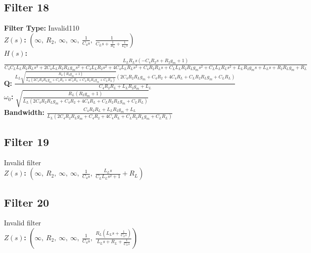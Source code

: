 \documentclass{article}
\begin{document}
\subsection*{Filter 18}
\textbf{Filter Type:} Invalid110 \\ 
\textbf{$Z(s)$:} $\left( \infty, \  R_{2}, \  \infty, \  \infty, \  \frac{1}{C_{4} s}, \  \frac{1}{C_{L} s + \frac{1}{R_{L}} + \frac{1}{L_{L} s}}\right)$ \\ 
\textbf{$H(s)$:} $\frac{L_{L} R_{L} s \left(- C_{4} R_{2} s + R_{2} g_{m} + 1\right)}{C_{4} C_{L} L_{L} R_{2} R_{L} s^{3} + 2 C_{4} L_{L} R_{2} R_{L} g_{m} s^{2} + C_{4} L_{L} R_{2} s^{2} + 4 C_{4} L_{L} R_{L} s^{2} + C_{4} R_{2} R_{L} s + C_{L} L_{L} R_{2} R_{L} g_{m} s^{2} + C_{L} L_{L} R_{L} s^{2} + L_{L} R_{2} g_{m} s + L_{L} s + R_{2} R_{L} g_{m} + R_{L}}$ \\ 
\textbf{Q:} $\frac{L_{L} \sqrt{\frac{R_{L} \left(R_{2} g_{m} + 1\right)}{L_{L} \left(2 C_{4} R_{2} R_{L} g_{m} + C_{4} R_{2} + 4 C_{4} R_{L} + C_{L} R_{2} R_{L} g_{m} + C_{L} R_{L}\right)}} \left(2 C_{4} R_{2} R_{L} g_{m} + C_{4} R_{2} + 4 C_{4} R_{L} + C_{L} R_{2} R_{L} g_{m} + C_{L} R_{L}\right)}{C_{4} R_{2} R_{L} + L_{L} R_{2} g_{m} + L_{L}}$ \\ 
\textbf{$\omega_0$:} $\sqrt{\frac{R_{L} \left(R_{2} g_{m} + 1\right)}{L_{L} \left(2 C_{4} R_{2} R_{L} g_{m} + C_{4} R_{2} + 4 C_{4} R_{L} + C_{L} R_{2} R_{L} g_{m} + C_{L} R_{L}\right)}}$ \\ 
\textbf{Bandwidth:} $\frac{C_{4} R_{2} R_{L} + L_{L} R_{2} g_{m} + L_{L}}{L_{L} \left(2 C_{4} R_{2} R_{L} g_{m} + C_{4} R_{2} + 4 C_{4} R_{L} + C_{L} R_{2} R_{L} g_{m} + C_{L} R_{L}\right)}$ \\ 
\subsection*{Filter 19}
Invalid filter \\ 
\textbf{$Z(s)$:} $\left( \infty, \  R_{2}, \  \infty, \  \infty, \  \frac{1}{C_{4} s}, \  \frac{L_{L} s}{C_{L} L_{L} s^{2} + 1} + R_{L}\right)$ \\ 
\subsection*{Filter 20}
Invalid filter \\ 
\textbf{$Z(s)$:} $\left( \infty, \  R_{2}, \  \infty, \  \infty, \  \frac{1}{C_{4} s}, \  \frac{R_{L} \left(L_{L} s + \frac{1}{C_{L} s}\right)}{L_{L} s + R_{L} + \frac{1}{C_{L} s}}\right)$ \\ 
\end{document}
